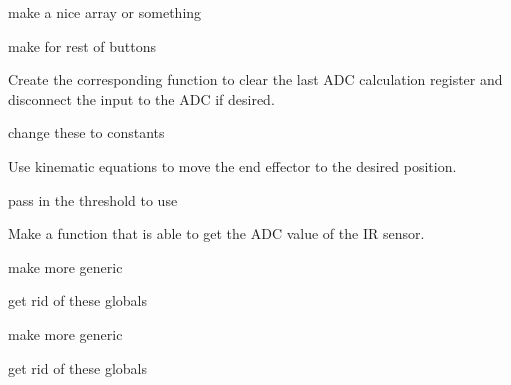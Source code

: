 
\begin{DoxyRefList}
\item[\label{todo__todo000006}%
\hypertarget{todo__todo000006}{}%
Member \hyperlink{button_8c_ab1786ed48313233e3df624178bd9b707}{b7} ]make a nice array or something 

make for rest of buttons  
\item[\label{todo__todo000001}%
\hypertarget{todo__todo000001}{}%
Member \hyperlink{_a_d_c_8c_a3eef680fc13f11498db80fb145cab8f9}{clear\+A\+DC} (int channel)]Create the corresponding function to clear the last A\+DC calculation register and disconnect the input to the A\+DC if desired.  
\item[\label{todo__todo000002}%
\hypertarget{todo__todo000002}{}%
Member \hyperlink{arm_8c_ab1df5f43b22723b086d287834af86099}{degrees\+Per\+Joint2\+Val} ]change these to constants  
\item[\label{todo__todo000009}%
\hypertarget{todo__todo000009}{}%
Member \hyperlink{motors_8c_aa294b49bfcc17cf4b490fb020e359851}{goto\+XY} (int x, int y)]Use kinematic equations to move the end effector to the desired position.  
\item[\label{todo__todo000005}%
\hypertarget{todo__todo000005}{}%
Member \hyperlink{arm_8c_a39c5ec2326206bfdd7d3c68693cf8143}{in\+Position} (int theta1, int theta2)]pass in the threshold to use  
\item[\label{todo__todo000010}%
\hypertarget{todo__todo000010}{}%
Member \hyperlink{_periph_8c_ae0fb6b592e76f0934db14682e63982df}{I\+R\+Dist} (int chan)]Make a function that is able to get the A\+DC value of the IR sensor.  
\item[\label{todo__todo000008}%
\hypertarget{todo__todo000008}{}%
Member \hyperlink{lab1_8c_a2dcb6711e68dfcff6d48d6a4871589fa}{set\+Frequency\+For\+Post\+Scale} (int Frequency)]make more generic 
\item[\label{todo__todo000004}%
\hypertarget{todo__todo000004}{}%
Member \hyperlink{arm_8c_a6768686fa1db632b8d252e73b43633d5}{upper\+Angle} ]get rid of these globals  
\item[\label{todo__todo000007}%
\hypertarget{todo__todo000007}{}%
Member \hyperlink{lab1_8c_a374e2c796c7a4ffb45af9cde77c8cc14}{wait\+For\+Button7} ()]make more generic  
\item[\label{todo__todo000003}%
\hypertarget{todo__todo000003}{}%
Member \hyperlink{arm_8c_adec4b270699e4ef43679cf77763c719a}{y\+\_\+coord} ]get rid of these globals 
\end{DoxyRefList}